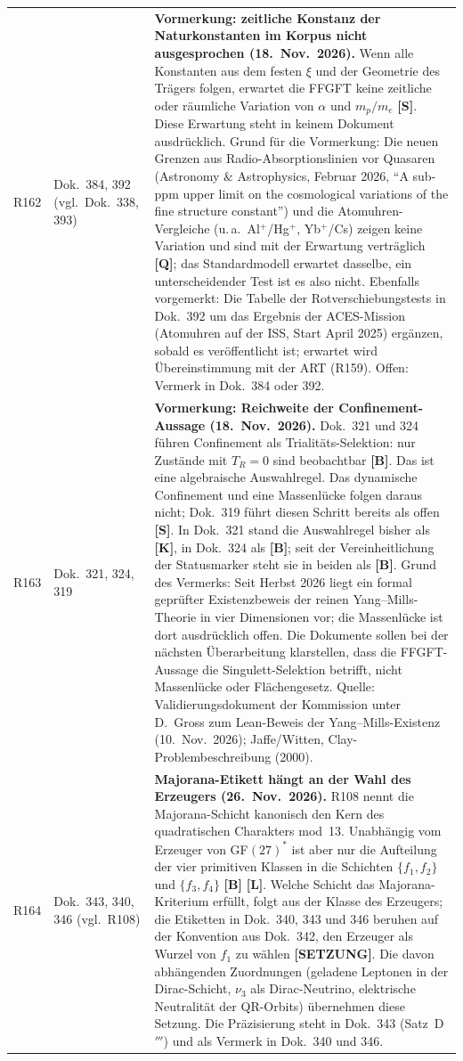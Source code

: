 \begin{longtable}{@{}p{0.9cm}p{3.1cm}p{10.2cm}@{}}
R162 & Dok.~384, 392 (vgl.\ Dok.~338, 393) & \textbf{Vormerkung: zeitliche Konstanz der Naturkonstanten im Korpus nicht ausgesprochen (18.~Nov.~2026).} Wenn alle Konstanten aus dem festen $\xi$ und der Geometrie des Trägers folgen, erwartet die FFGFT keine zeitliche oder räumliche Variation von $\alpha$ und $m_p/m_e$ \textbf{[S]}. Diese Erwartung steht in keinem Dokument ausdrücklich. Grund für die Vormerkung: Die neuen Grenzen aus Radio-Absorptionslinien vor Quasaren (Astronomy \& Astrophysics, Februar 2026, \enquote{A sub-ppm upper limit on the cosmological variations of the fine structure constant}) und die Atomuhren-Vergleiche (u.\,a.\ Al$^+$/Hg$^+$, Yb$^+$/Cs) zeigen keine Variation und sind mit der Erwartung verträglich \textbf{[Q]}; das Standardmodell erwartet dasselbe, ein unterscheidender Test ist es also nicht. Ebenfalls vorgemerkt: Die Tabelle der Rotverschiebungstests in Dok.~392 um das Ergebnis der ACES-Mission (Atomuhren auf der ISS, Start April 2025) ergänzen, sobald es veröffentlicht ist; erwartet wird Übereinstimmung mit der ART (R159). Offen: Vermerk in Dok.~384 oder 392. \\
R163 & Dok.~321, 324, 319 & \textbf{Vormerkung: Reichweite der Confinement-Aussage (18.~Nov.~2026).} Dok.~321 und 324 führen Confinement als Trialitäts-Selektion: nur Zustände mit $T_R=0$ sind beobachtbar \textbf{[B]}. Das ist eine algebraische Auswahlregel. Das dynamische Confinement und eine Massenlücke folgen daraus nicht; Dok.~319 führt diesen Schritt bereits als offen \textbf{[S]}. In Dok.~321 stand die Auswahlregel bisher als \textbf{[K]}, in Dok.~324 als \textbf{[B]}; seit der Vereinheitlichung der Statusmarker steht sie in beiden als \textbf{[B]}. Grund des Vermerks: Seit Herbst 2026 liegt ein formal geprüfter Existenzbeweis der reinen Yang--Mills-Theorie in vier Dimensionen vor; die Massenlücke ist dort ausdrücklich offen. Die Dokumente sollen bei der nächsten Überarbeitung klarstellen, dass die FFGFT-Aussage die Singulett-Selektion betrifft, nicht Massenlücke oder Flächengesetz. Quelle: Validierungsdokument der Kommission unter D.~Gross zum Lean-Beweis der Yang--Mills-Existenz (10.~Nov.~2026); Jaffe/Witten, Clay-Problembeschreibung (2000). \\
R164 & Dok.~343, 340, 346 (vgl.\ R108) & \textbf{Majorana-Etikett hängt an der Wahl des Erzeugers (26.~Nov.~2026).} R108 nennt die Majorana-Schicht kanonisch den Kern des quadratischen Charakters mod~13. Unabhängig vom Erzeuger von GF$(27)^*$ ist aber nur die Aufteilung der vier primitiven Klassen in die Schichten $\{f_1,f_2\}$ und $\{f_3,f_4\}$ \textbf{[B]} \textbf{[L]}. Welche Schicht das Majorana-Kriterium erfüllt, folgt aus der Klasse des Erzeugers; die Etiketten in Dok.~340, 343 und 346 beruhen auf der Konvention aus Dok.~342, den Erzeuger als Wurzel von $f_1$ zu wählen \textbf{[SETZUNG]}. Die davon abhängenden Zuordnungen (geladene Leptonen in der Dirac-Schicht, $\nu_3$ als Dirac-Neutrino, elektrische Neutralität der QR-Orbits) übernehmen diese Setzung. Die Präzisierung steht in Dok.~343 (Satz~D$'''$) und als Vermerk in Dok.~340 und 346. \\
\end{longtable}
\endgroup

